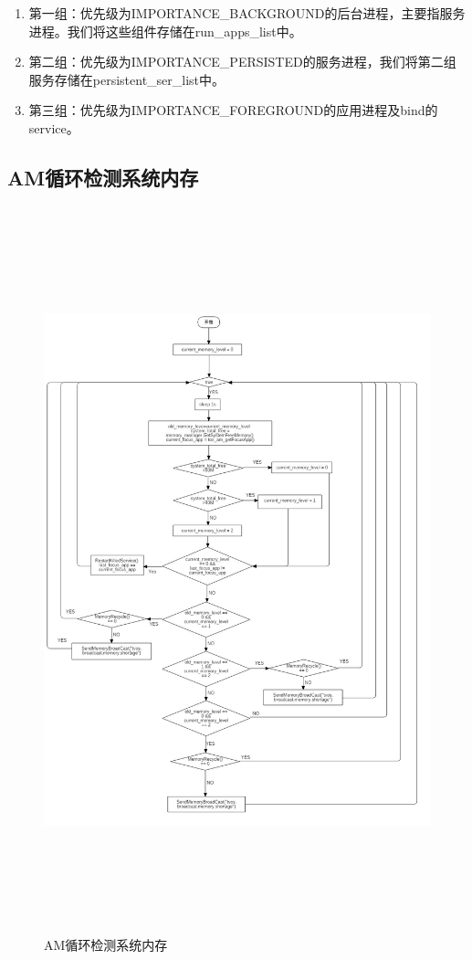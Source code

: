 \begin{enumerate}
  \item 第一组：优先级为IMPORTANCE\_BACKGROUND的后台进程，主要指服务进程。我们将这些组件存储在run\_apps\_list中。
  \item 第二组：优先级为IMPORTANCE\_PERSISTED的服务进程，我们将第二组服务存储在persistent\_ser\_list中。
  \item 第三组：优先级为IMPORTANCE\_FOREGROUND的应用进程及bind的service。
\end{enumerate}
\subsection{AM循环检测系统内存}
\begin{figure}[H] 
  \centering 
  \includegraphics[width=17cm,height=21cm]{image/tbrw2_app_optimization/png/memory_check.jpg}
  \caption{AM循环检测系统内存}
\end{figure}
